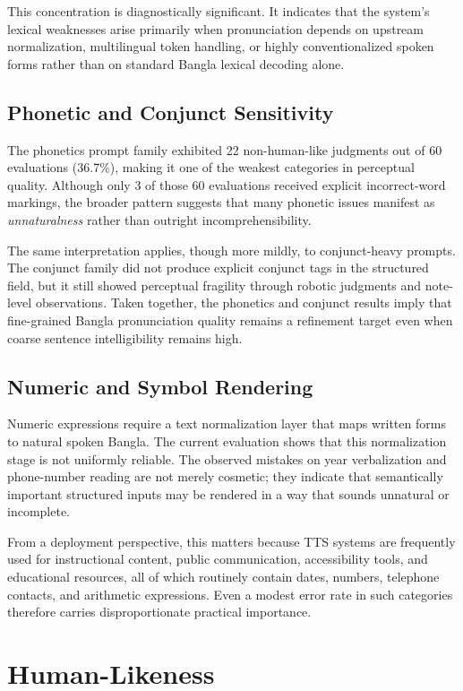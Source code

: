 This concentration is diagnostically significant. It indicates that the system's lexical weaknesses arise primarily when pronunciation depends on upstream normalization, multilingual token handling, or highly conventionalized spoken forms rather than on standard Bangla lexical decoding alone.

\subsection{Phonetic and Conjunct Sensitivity}

The phonetics prompt family exhibited 22 non-human-like judgments out of 60 evaluations (36.7\%), making it one of the weakest categories in perceptual quality. Although only 3 of those 60 evaluations received explicit incorrect-word markings, the broader pattern suggests that many phonetic issues manifest as \textit{unnaturalness} rather than outright incomprehensibility.

The same interpretation applies, though more mildly, to conjunct-heavy prompts. The conjunct family did not produce explicit conjunct tags in the structured field, but it still showed perceptual fragility through robotic judgments and note-level observations. Taken together, the phonetics and conjunct results imply that fine-grained Bangla pronunciation quality remains a refinement target even when coarse sentence intelligibility remains high.

\subsection{Numeric and Symbol Rendering}

Numeric expressions require a text normalization layer that maps written forms to natural spoken Bangla. The current evaluation shows that this normalization stage is not uniformly reliable. The observed mistakes on year verbalization and phone-number reading are not merely cosmetic; they indicate that semantically important structured inputs may be rendered in a way that sounds unnatural or incomplete.

From a deployment perspective, this matters because TTS systems are frequently used for instructional content, public communication, accessibility tools, and educational resources, all of which routinely contain dates, numbers, telephone contacts, and arithmetic expressions. Even a modest error rate in such categories therefore carries disproportionate practical importance.

\section{Human-Likeness}

